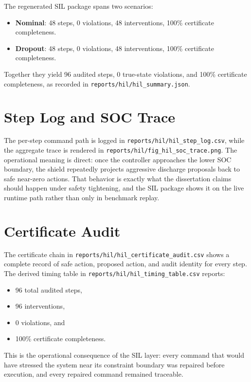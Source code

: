 The regenerated SIL package spans two scenarios:

\begin{itemize}
  \item \textbf{Nominal}: 48 steps, 0 violations, 48 interventions,
    100\% certificate completeness.
  \item \textbf{Dropout}: 48 steps, 0 violations, 48 interventions,
    100\% certificate completeness.
\end{itemize}

Together they yield 96 audited steps, 0 true-state violations, and 100\%
certificate completeness, as recorded in
\texttt{reports/hil/hil\_summary.json}.

\section{Step Log and SOC Trace}

The per-step command path is logged in
\texttt{reports/hil/hil\_step\_log.csv}, while the aggregate trace is rendered
in \texttt{reports/hil/fig\_hil\_soc\_trace.png}.  The operational meaning is
direct: once the controller approaches the lower SOC boundary, the shield
repeatedly projects aggressive discharge proposals back to safe near-zero
actions.  That behavior is exactly what the dissertation claims should
happen under safety tightening, and the SIL package shows it on the live
runtime path rather than only in benchmark replay.

\section{Certificate Audit}

The certificate chain in
\texttt{reports/hil/hil\_certificate\_audit.csv} shows a complete record of
safe action, proposed action, and audit identity for every step.  The
derived timing table in \texttt{reports/hil/hil\_timing\_table.csv} reports:

\begin{itemize}
  \item 96 total audited steps,
  \item 96 interventions,
  \item 0 violations, and
  \item 100\% certificate completeness.
\end{itemize}

This is the operational consequence of the SIL layer: every command
that would have stressed the system near its constraint boundary was repaired before
execution, and every repaired command remained traceable.

